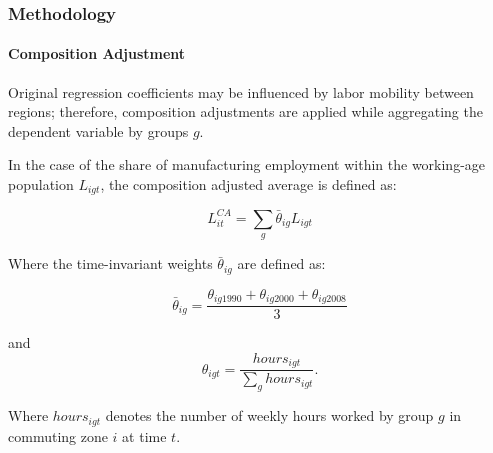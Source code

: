 \begin{frame}
    \frametitle{Methodology}
    \framesubtitle{Composition Adjustment}
    
    Original regression coefficients may be influenced by labor mobility between regions; therefore, composition adjustments are applied while aggregating the dependent variable by groups $g$. 
    
    In the case of the share of manufacturing employment within the working-age population $L_{igt}$, the composition adjusted average is defined as:

    \begin{equation}
        L_{it}^{CA} = \sum_g \bar{\theta}_{ig} L_{igt}
        \label{eq:composition_adjustment}
    \end{equation}

    Where the time-invariant weights $\bar{\theta}_{ig}$ are defined as:

    \begin{equation}
        \bar{\theta}_{ig} = \frac{\theta_{ig1990}+ \theta_{ig2000}+ \theta_{ig2008}}{3} 
        \label{eq:time_invariant_weight}
    \end{equation}
    
    and 
    \begin{equation}
        \theta_{igt} = \dfrac{hours_{igt}}{\sum_g hours_{igt}}.
        \label{eq:weight_per_group}
    \end{equation}

    Where $hours_{igt}$ denotes the number of weekly hours worked by group $g$ in commuting zone $i$ at time $t$.
\end{frame}
